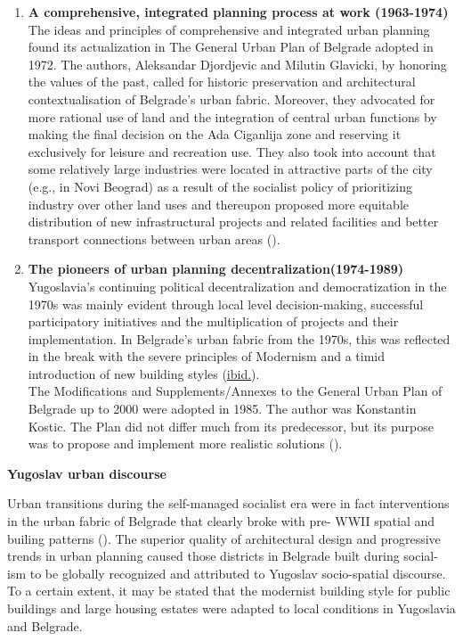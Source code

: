 \documentclass[11pt]{report}
\begin{document}
\begin{enumerate}
\item \textbf{A comprehensive, integrated planning process at work (1963-1974)}
\\
The ideas and principles of comprehensive and integrated urban planning found its actualization in The General Urban Plan of Belgrade adopted in 1972. The authors, Aleksandar Djordjevic and Milutin Glavicki, by honoring the values of the past, called for historic preservation and architectural contextualisation of Belgrade’s urban fabric. Moreover, they advocated for more rational use of land and the integration of central urban functions by making the final decision on the Ada Ciganlija zone and reserving it exclusively for leisure and recreation use. They also took into account that some relatively large industries were located in attractive parts of the city (e.g., in Novi Beograd) as a result of the socialist policy of prioritizing industry over other land uses and thereupon proposed more equitable distribution of new infrastructural projects and related facilities and better transport connections between urban areas (\href{Hirt}{\citealt{hirt_belgrade_2009}}).

\item \textbf{The pioneers of urban planning decentralization(1974-1989)}
\\
Yugoslavia’s continuing political decentralization and democratization in the 1970s was mainly evident through local level decision-making, successful participatory initiatives and the multiplication of projects and their implementation. In Belgrade’s urban fabric from the 1970s, this was reflected in the break with the severe principles of Modernism and a timid introduction of new building styles (\href{ref}{ibid.}).
\\
The Modifications  and  Supplements/Annexes  to  the  General  Urban  Plan  of  Belgrade  up  to 2000 were adopted in 1985. The author was Konstantin Kostic.
The Plan did not differ much from its predecessor, but its purpose was to propose and implement more realistic solutions (\href{Grozdanic}{\citealt{grozdanic_belgrade_2008}}).
\end{enumerate}
 
\textbf{Yugoslav urban discourse}

Urban transitions during the self-managed socialist era were in fact interventions in the urban fabric of Belgrade that clearly broke with pre- WWII spatial and builing patterns (\href{Hirt}{\citealt{hirt_belgrade_2009}}). The superior quality of architectural design and progressive trends in urban planning caused those districts in Belgrade built during social- ism to be globally recognized and attributed to Yugoslav socio-spatial discourse. To a certain extent, it may be stated that the modernist building style for public buildings and large housing estates were adapted to local conditions in Yugoslavia and Belgrade.
\\
\end{document}
